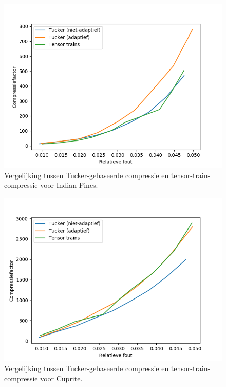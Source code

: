 \begin{figure}[]
  \centering
  \includegraphics[scale=0.7]{images/tucker_vs_tensor_trains_Indian_Pines.png}
  \caption{Vergelijking tussen Tucker-gebaseerde compressie en tensor-train-compressie voor Indian Pines.}
\label{fig:tucker-vs-tensor-trains-indian-pines}
\end{figure}

\begin{figure}[]
  \centering
  \includegraphics[scale=0.7]{images/tucker_vs_tensor_trains_Cuprite.png}
  \caption{Vergelijking tussen Tucker-gebaseerde compressie en tensor-train-compressie voor Cuprite.}
\label{fig:tucker-vs-tensor-trains-cuprite}
\end{figure}

